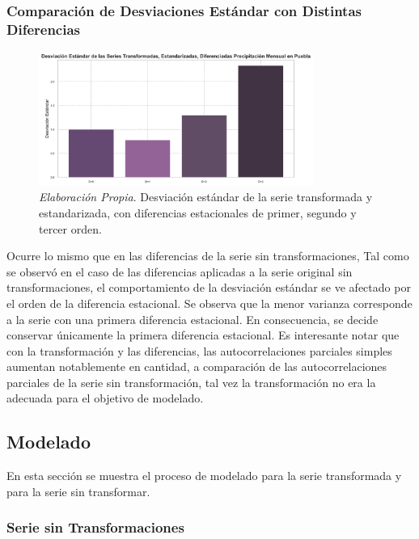 \documentclass[12pt,letterpaper]{article}   %
\begin{document}
\newpage
  \subsubsection{Comparación de Desviaciones Estándar con Distintas Diferencias}

\begin{figure}[ht]
    \centering
    \includegraphics[width=0.8\textwidth]{imagenes/03-13-std-Ds.pdf}
    \caption{\textit{Elaboración Propia}. Desviación estándar de la serie transformada y estandarizada, con diferencias estacionales de primer, segundo y tercer orden.}
\end{figure}

Ocurre lo mismo que en las diferencias de la serie sin transformaciones,  
Tal como se observó en el caso de las diferencias aplicadas a la serie original sin transformaciones, el comportamiento de la desviación estándar se ve afectado por el orden de la diferencia estacional. Se observa que la menor varianza corresponde a la serie con una primera diferencia estacional. En consecuencia, se decide conservar únicamente la primera diferencia estacional. Es interesante notar que con la transformación y las diferencias, las autocorrelaciones parciales simples aumentan notablemente en cantidad, a comparación de las autocorrelaciones parciales de la serie sin transformación,  tal vez la transformación no era la adecuada para el objetivo de modelado.


\newpage
\subsection{Modelado}

En esta sección se muestra el proceso de modelado para la serie transformada y para la serie sin transformar.

\subsubsection{Serie sin Transformaciones}
\end{document}
